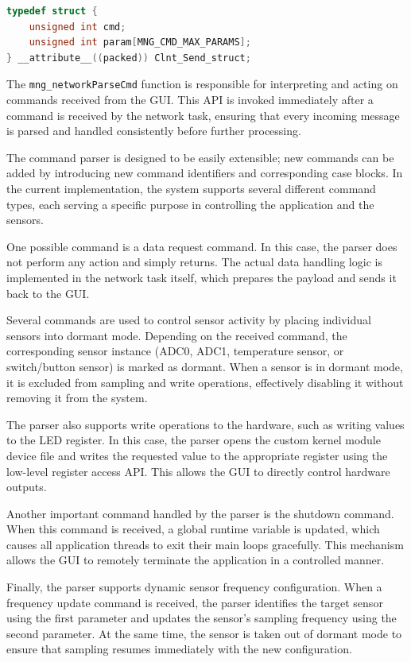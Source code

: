 \documentclass{article}
\begin{document}
\begin{lstlisting}[language=C,
caption={Send Command Structure},
label={lst:Clnt_Send_struct}]
typedef struct {
    unsigned int cmd;                   
    unsigned int param[MNG_CMD_MAX_PARAMS];     
} __attribute__((packed)) Clnt_Send_struct;
\end{lstlisting}


The \texttt{mng\_networkParseCmd} function is responsible for interpreting and acting on commands received from the GUI. This API is invoked immediately after a command is received by the network task, ensuring that every incoming message is parsed and handled consistently before further processing.

The command parser is designed to be easily extensible; new commands can be added by introducing new command identifiers and corresponding case blocks. In the current implementation, the system supports several different command types, each serving a specific purpose in controlling the application and the sensors.

One possible command is a data request command. In this case, the parser does not perform any action and simply returns. The actual data handling logic is implemented in the network task itself, which prepares the payload and sends it back to the GUI.

Several commands are used to control sensor activity by placing individual sensors into dormant mode. Depending on the received command, the corresponding sensor instance (ADC0, ADC1, temperature sensor, or switch/button sensor) is marked as dormant. When a sensor is in dormant mode, it is excluded from sampling and write operations, effectively disabling it without removing it from the system.

The parser also supports write operations to the hardware, such as writing values to the LED register. In this case, the parser opens the custom kernel module device file and writes the requested value to the appropriate register using the low-level register access API. This allows the GUI to directly control hardware outputs.

Another important command handled by the parser is the shutdown command. When this command is received, a global runtime variable is updated, which causes all application threads to exit their main loops gracefully. This mechanism allows the GUI to remotely terminate the application in a controlled manner.

Finally, the parser supports dynamic sensor frequency configuration. When a frequency update command is received, the parser identifies the target sensor using the first parameter and updates the sensor’s sampling frequency using the second parameter. At the same time, the sensor is taken out of dormant mode to ensure that sampling resumes immediately with the new configuration.
\end{document}
